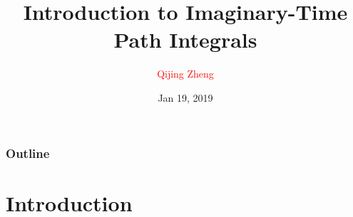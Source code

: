 \documentclass[8pt,dvipsnames]{beamer}
\title[]{
  Introduction to Imaginary-Time Path Integrals
}
\author[Q.J. Zheng]{
  \textcolor{red}{Qijing Zheng} \\
}
\institute[D.P. USTC]{
  Department of Physics \\
  \medskip
  University of Science and Technology of China \\
  \smallskip
  \texttt{[image: logo.jpg]}
}
\date{Jan 19, 2019}
\begin{document}
\begin{frame}
  \titlepage
\end{frame}

\begin{frame}
  \frametitle{Outline}
  \tableofcontents
\end{frame}

\section{Introduction}
\end{document}
